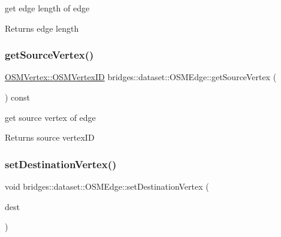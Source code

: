 get edge length of edge

\begin{DoxyReturn}{Returns}
edge length 
\end{DoxyReturn}
\mbox{\label{classbridges_1_1dataset_1_1_o_s_m_edge_abe843416c79a4765a7ecb52d02283310}} 
\subsubsection{\texorpdfstring{get\+Source\+Vertex()}{getSourceVertex()}}
{\footnotesize\ttfamily \hyperlink{classbridges_1_1dataset_1_1_o_s_m_vertex_ad166f13b0aefbdc05a273546f2a3bb96}{O\+S\+M\+Vertex\+::\+O\+S\+M\+Vertex\+ID} bridges\+::dataset\+::\+O\+S\+M\+Edge\+::get\+Source\+Vertex (\begin{DoxyParamCaption}{ }\end{DoxyParamCaption}) const\hspace{0.3cm}{\ttfamily [inline]}}

get source vertex of edge

\begin{DoxyReturn}{Returns}
source vertex\+ID 
\end{DoxyReturn}
\mbox{\label{classbridges_1_1dataset_1_1_o_s_m_edge_a71868ae7357fc2aaa576e6befbbb0112}} 
\subsubsection{\texorpdfstring{set\+Destination\+Vertex()}{setDestinationVertex()}}
{\footnotesize\ttfamily void bridges\+::dataset\+::\+O\+S\+M\+Edge\+::set\+Destination\+Vertex (\begin{DoxyParamCaption}\item[{\hyperlink{classbridges_1_1dataset_1_1_o_s_m_vertex_ad166f13b0aefbdc05a273546f2a3bb96}{O\+S\+M\+Vertex\+::\+O\+S\+M\+Vertex\+ID}}]{dest }\end{DoxyParamCaption})\hspace{0.3cm}{\ttfamily [inline]}}

